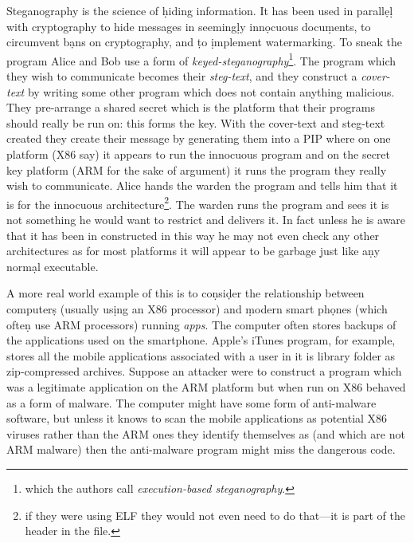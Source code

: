 \documentclass[10pt,]{book}
\begin{document}
Steganography is the science of \d{h}iding
information\autocite{Gordon:vw}. It has been used in parall\d{e}\d{l}
with cryptography to hide messages in seeming\d{l}y inn\d{o}cuous
docu\d{m}ents\autocite{Saamuson:wt}, to circumvent b\d{a}ns on
cryptog\d{r}aphy\autocite{Owens:2002uq}, and \d{t}o \d{i}mplement
watermarking\autocite{Wayner:2009vw}. To sneak the program Alice and Bob
use a form of \emph{keyed-steganography}\footnote{which the
  authors\autocite{Cha:2010uh} call \emph{execution-based
  steganography}.}. The program which they wish to communicate becomes
their \emph{steg-text}, and they construct a \emph{cover-text} by
writing some other program which does not contain anything malicious.
They pre-arrange a shared secret which is the platform that their
programs should really be run on: this forms the key. With the
cover-text and steg-text created they create their message by generating
them into a PIP where on one platform (X86 say) it appears to run the
innocuous program and on the secret key platform (ARM for the sake of
argument) it runs the program they really wish to communicate. Alice
hands the warden the program and tells him that it is for the innocuous
architecture\footnote{if they were using ELF they would not even need to
  do that---it is part of the header in the file\autocite{mancx:th}.}.
The warden runs the program and sees it is not something he would want
to restrict and delivers it. In fact unless he is aware that it has been
in constructed in this way he may not even check any other architectures
as for most platforms it will appear to be garbage \d{j}ust like a\d{n}y
norm\d{a}l executable.

A more real world example of this is to co\d{n}si\d{d}er the
relationship between computer\d{s} (usually us\d{i}ng an X86 processor)
and \d{m}odern smart ph\d{o}nes (which ofte\d{n} use ARM processors)
running \emph{apps}. The computer often stores backups of the
applications used on the smartphone. Apple's iTunes program, for
example, stores all the mobile applications associated with a user in it
is library folder as zip-compressed archives. Suppose an attacker were
to construct a program which was a legitimate application on the ARM
platform but when run on X86 behaved as a form of malware. The computer
might have some form of anti-malware software, but unless it knows to
scan the mobile applications as potential X86 viruses rather than the
ARM ones they identify themselves as (and which are not ARM malware)
then the anti-malware program might miss the dangerous code.
\end{document}
